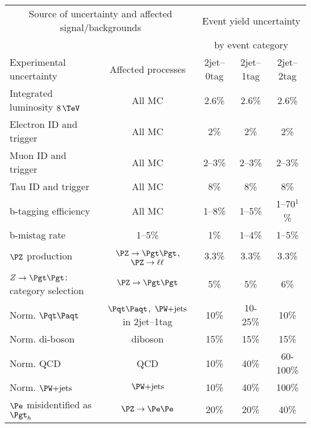 
\begin{table}[tbhp]
\begin{center}
    \begin{tabular}{|l|c|c|c|c|}
    \hline
    \multicolumn{2}{|c|}{Source of uncertainty and affected signal/backgrounds} & \multicolumn{3}{|c|}{Event yield uncertainty}  \\
    \multicolumn{2}{|c|}{} & \multicolumn{3}{|c|}{by event category} \\
    \hline
     Experimental uncertainty                                  & Affected processes &  2jet--0tag    &  2jet--1tag  &  2jet--2tag      \\
     \hline
     Integrated luminosity $8\,\TeV$                           & All MC & 2.6\% & 2.6\% & 2.6\%       \\
     Electron ID and trigger                                   & All MC &  2\%  & 2\%  & 2\%       \\
     Muon ID and trigger                                       & All MC & 2--3\%       &   2--3\%    & 2--3\%       \\
     Tau ID and trigger                                        & All MC & 8\%  & 8\% & 8\%           \\
     b-tagging efficiency                                      & All MC & 1--8\% &   1--5\%  & 1--70$^{1}$\% \\
     b-mistag rate                                             & 1--5\% & 1\%    &   1--4\%  &   1--5\%       \\
     \hline
     $\PZ$ production                                          & $\ZToTauTau$, $\PZ\to\ell\ell$ & 3.3\%     &   3.3\%    & 3.3\%      \\
     $Z\to\Pgt\Pgt$: category selection                        & $\ZToTauTau$ & 5\%  & 5\% & 6\%        \\
     Norm. $\ttbar$                                            & $\ttbar$, $\WJets$ in 2jet--1tag & 10\%  &   10-25\%  &  10\%        \\
     Norm. di-boson                                            & diboson & 15\%   &   15\%  &  15\%      \\
     Norm. QCD                                                 & QCD  & 10\%    &   40\% & 60-100\%         \\
     Norm. $\WJets$                                            & $\WJets$ & 10\% &  40\% & 100\%             \\
     $\Pe$ misidentified as $\Pgth$                            & $\PZ\to\Pe\Pe$ & 20\%     & 20\%   & 40\%      \\

\end{tabular}
\end{center}
\end{table}
